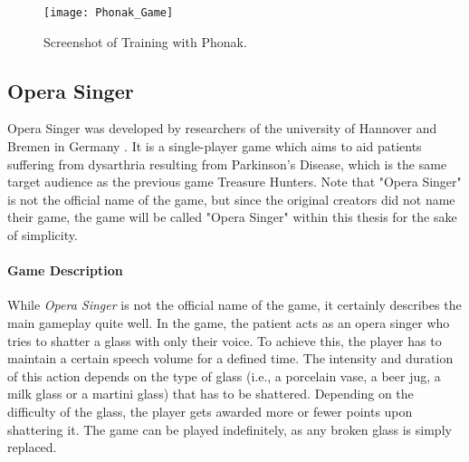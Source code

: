 \documentclass[draft,final]{vutinfth} %
\begin{document}
\begin{figure}
\begin{center}
\texttt{[image: Phonak\_Game]}
\end{center}
\caption{Screenshot of Training with Phonak\cite{Phonak}.}
\end{figure}
\subsection{Opera Singer}
Opera Singer was developed by researchers of the university of Hannover and Bremen in Germany \cite{ParkinsonGame}. It is a single-player game which aims to aid patients suffering from dysarthria resulting from Parkinson's Disease, which is the same target audience as the previous game Treasure Hunters. Note that "Opera Singer" is not the official name of the game, but since the original creators did not name their game, the game will be called "Opera Singer" within this thesis for the sake of simplicity.

\paragraph{Game Description} 
While \emph{Opera Singer} is not the official name of the game, it certainly describes the main gameplay quite well. In the game, the patient acts as an opera singer who tries to shatter a glass with only their voice. To achieve this, the player has to maintain a certain speech volume for a defined time. The intensity and duration of this action depends on the type of glass (i.e., a porcelain vase, a beer jug, a milk glass or a martini glass) that has to be shattered. Depending on the difficulty of the glass, the player gets awarded more or fewer points upon shattering it. The game can be played indefinitely, as any broken glass is simply replaced.
\end{document}
